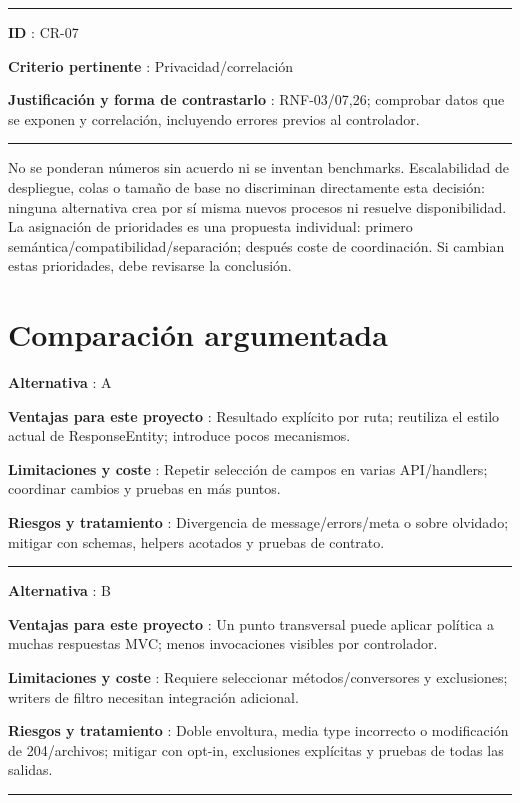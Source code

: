 \documentclass[12pt,a4paper]{report}
\begin{document}
\medskip\hrule\medskip

\textbf{ID }: CR-07

\textbf{Criterio pertinente }: Privacidad/correlación

\textbf{Justificación y forma de contrastarlo }: RNF-03/07,26;
comprobar datos que se exponen y correlación, incluyendo errores previos
al controlador.

\medskip\hrule\medskip

No se ponderan números sin acuerdo ni se inventan benchmarks.
Escalabilidad de despliegue, colas o tamaño de base no discriminan
directamente esta decisión: ninguna alternativa crea por sí misma nuevos
procesos ni resuelve disponibilidad. La asignación de prioridades es una
propuesta individual: primero semántica/compatibilidad/separación;
después coste de coordinación. Si cambian estas prioridades, debe
revisarse la conclusión.

\section{Comparación
argumentada}\label{analisis-comparaciuxf3n-argumentada}

\textbf{Alternativa }: A

\textbf{Ventajas para este proyecto }: Resultado explícito por ruta;
reutiliza el estilo actual de ResponseEntity; introduce pocos
mecanismos.

\textbf{Limitaciones y coste }: Repetir selección de campos en varias
API/handlers; coordinar cambios y pruebas en más puntos.

\textbf{Riesgos y tratamiento }: Divergencia de message/errors/meta o
sobre olvidado; mitigar con schemas, helpers acotados y pruebas de
contrato.

\medskip\hrule\medskip

\textbf{Alternativa }: B

\textbf{Ventajas para este proyecto }: Un punto transversal puede
aplicar política a muchas respuestas MVC; menos invocaciones visibles
por controlador.

\textbf{Limitaciones y coste }: Requiere seleccionar métodos/conversores
y exclusiones; writers de filtro necesitan integración adicional.

\textbf{Riesgos y tratamiento }: Doble envoltura, media type incorrecto
o modificación de 204/archivos; mitigar con opt-in, exclusiones
explícitas y pruebas de todas las salidas.

\medskip\hrule\medskip
\end{document}
